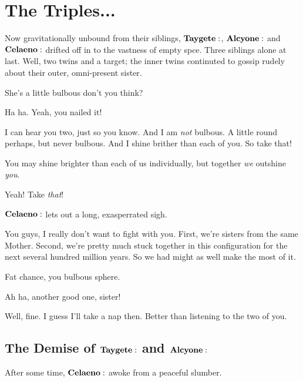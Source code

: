 \documentclass[main.tex]{subfiles}
\begin{document}
\section{The Triples...}

 
Now gravitationally unbound from their siblings, $\Taygete$, $\Alcyone$ and $\Celaeno$ drifted off in to the vastness of empty spce.  Three siblings alone at last.  Well, two twins and a target; the inner twins continuted to gossip rudely about their outer, omni-present sister.

\Taygete She's a little bulbous don't you think?

\Alcyone  Ha ha.  Yeah, you nailed it!

\Celaeno  I can hear you two, just so you know.  And I am \textit{not} bulbous.  A little round perhaps, but never bulbous.  And I shine brither than each of you.  So take that!

\Alcyone You may shine brighter than each of us individually, but together \textit{we} outshine \textit{you}.  

\Taygete Yeah!  Take \textit{that}!

$\Celaeno$ lets out a long, exasperrated sigh.

\Celaeno You guys, I really don't want to fight with you.  First, we're sisters from the same Mother.  Second, we're pretty much stuck together in this configuration for the next several hundred million years.  So we had might as well make the most of it.

\Taygete Fat chance, you bulbous sphere.

\Alcyone Ah ha, another good one, sister!

\Celaeno Well, fine.  I guess I'll take a nap then.  Better than listening to the two of you.

\subsection{The Demise of $\Taygete$ and $\Alcyone$}

After some time, $\Celaeno$ awoke from a peaceful slumber.  
\end{document}
